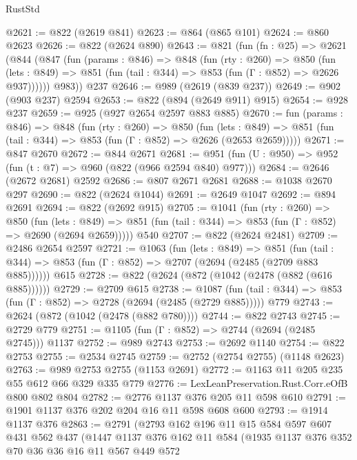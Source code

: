 \begin{lexlean}{RustStd}
\begin{coremodule}
{\begin{coremodule}
{{{{{{{{{@2621 := @822 (@2619 @841)
@2623 := @864 (@865 @101)
@2624 := @860 @2623
@2626 := @822 (@2624 @890)
@2643 := @821
    (fun (fn : @25) =>
    @2621
      (@844
        (@847
          (fun (params : @846) =>
          @848
            (fun (rty : @260) =>
            @850
              (fun (lets : @849) =>
              @851 (fun (tail : @344) => @853 (fun (Γ : @852) => @2626 @937))))))
        @983))
    @237
@2646 := @989 (@2619 (@839 @237))
@2649 := @902 (@903 @237) @2594
@2653 := @822 (@894 (@2649 @911) @915)
@2654 := @928 @237
@2659 := @925 (@927 @2654 @2597 @883 @885)
@2670 := fun (params : @846) =>
  @848
    (fun (rty : @260) =>
    @850
      (fun (lets : @849) =>
      @851 (fun (tail : @344) => @853 (fun (Γ : @852) => @2626 (@2653 @2659)))))
@2671 := @847 @2670
@2672 := @844 @2671
@2681 := @951 (fun (U : @950) => @952 (fun (t : @7) => @960 (@822 (@966 @2594 @840) @977)))
@2684 := @2646 (@2672 @2681) @2592
@2686 := @807 @2671 @2681
@2688 := @1038 @2670 @297
@2690 := @822 (@2624 @1044)
@2691 := @2649 @1047
@2692 := @894 @2691
@2694 := @822 (@2692 @915)
@2705 := @1041
    (fun (rty : @260) =>
    @850
      (fun (lets : @849) =>
      @851 (fun (tail : @344) => @853 (fun (Γ : @852) => @2690 (@2694 @2659)))))
    @540
@2707 := @822 (@2624 @2481)
@2709 := @2486 @2654 @2597
@2721 := @1063
    (fun (lets : @849) =>
    @851 (fun (tail : @344) => @853 (fun (Γ : @852) => @2707 (@2694 (@2485 (@2709 @883 @885))))))
    @615
@2728 := @822 (@2624 (@872 (@1042 (@2478 (@882 (@616 @885))))))
@2729 := @2709 @615
@2738 := @1087
    (fun (tail : @344) => @853 (fun (Γ : @852) => @2728 (@2694 (@2485 (@2729 @885)))))
    @779
@2743 := @2624 (@872 (@1042 (@2478 (@882 @780))))
@2744 := @822 @2743
@2745 := @2729 @779
@2751 := @1105 (fun (Γ : @852) => @2744 (@2694 (@2485 @2745))) @1137
@2752 := @989 @2743
@2753 := @2692 @1140
@2754 := @822 @2753
@2755 := @2534 @2745
@2759 := @2752 (@2754 @2755) (@1148 @2623)
@2763 := @989 @2753 @2755 (@1153 @2691)
@2772 := @1163 @11 @205 @235 @55 @612 @66 @329 @335 @779
@2776 := LexLeanPreservation.Rust.Corr.eOfB @800 @802 @804
@2782 := @2776 @1137 @376 @205 @11 @598 @610
@2791 := @1901 @1137 @376 @202 @204 @16 @11 @598 @608 @600
@2793 := @1914 @1137 @376
@2863 := @2791
    (@2793
      @162
      @196
      @11
      @15
      @584
      @597
      @607
      @431
      @562
      @437
      (@1447
        @1137
        @376
        @162
        @11
        @584
        (@1935
          @1137
          @376
          @352
          @70
          @36
          @36
          @16
          @11
          @567
          @449
          @572
}}}}}}}}}
\end{coremodule}}
\end{coremodule}
\end{lexlean}

